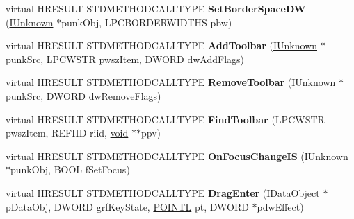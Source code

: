 \begin{DoxyCompactItemize}
\item 
\mbox{\label{class_c_common_browser_a0593cb501e88f934cb0a01f42e960cf0}} 
virtual H\+R\+E\+S\+U\+LT S\+T\+D\+M\+E\+T\+H\+O\+D\+C\+A\+L\+L\+T\+Y\+PE {\bfseries Set\+Border\+Space\+DW} (\hyperlink{interface_i_unknown}{I\+Unknown} $\ast$punk\+Obj, L\+P\+C\+B\+O\+R\+D\+E\+R\+W\+I\+D\+T\+HS pbw)
\item 
\mbox{\label{class_c_common_browser_a60b4607afb24afaa815d54dcf71691d6}} 
virtual H\+R\+E\+S\+U\+LT S\+T\+D\+M\+E\+T\+H\+O\+D\+C\+A\+L\+L\+T\+Y\+PE {\bfseries Add\+Toolbar} (\hyperlink{interface_i_unknown}{I\+Unknown} $\ast$punk\+Src, L\+P\+C\+W\+S\+TR pwsz\+Item, D\+W\+O\+RD dw\+Add\+Flags)
\item 
\mbox{\label{class_c_common_browser_acb1a1421cc2b6f0742801b1ea574cdb1}} 
virtual H\+R\+E\+S\+U\+LT S\+T\+D\+M\+E\+T\+H\+O\+D\+C\+A\+L\+L\+T\+Y\+PE {\bfseries Remove\+Toolbar} (\hyperlink{interface_i_unknown}{I\+Unknown} $\ast$punk\+Src, D\+W\+O\+RD dw\+Remove\+Flags)
\item 
\mbox{\label{class_c_common_browser_a145537e55fc865c879ebbd1c4d8a8868}} 
virtual H\+R\+E\+S\+U\+LT S\+T\+D\+M\+E\+T\+H\+O\+D\+C\+A\+L\+L\+T\+Y\+PE {\bfseries Find\+Toolbar} (L\+P\+C\+W\+S\+TR pwsz\+Item, R\+E\+F\+I\+ID riid, \hyperlink{interfacevoid}{void} $\ast$$\ast$ppv)
\item 
\mbox{\label{class_c_common_browser_aad8ff4bdf8a8dd8fb00b70612d2ae5eb}} 
virtual H\+R\+E\+S\+U\+LT S\+T\+D\+M\+E\+T\+H\+O\+D\+C\+A\+L\+L\+T\+Y\+PE {\bfseries On\+Focus\+Change\+IS} (\hyperlink{interface_i_unknown}{I\+Unknown} $\ast$punk\+Obj, B\+O\+OL f\+Set\+Focus)
\item 
\mbox{\label{class_c_common_browser_a401d58d5d3c9c1c573bc4b72b0d05aa1}} 
virtual H\+R\+E\+S\+U\+LT S\+T\+D\+M\+E\+T\+H\+O\+D\+C\+A\+L\+L\+T\+Y\+PE {\bfseries Drag\+Enter} (\hyperlink{interface_i_data_object}{I\+Data\+Object} $\ast$p\+Data\+Obj, D\+W\+O\+RD grf\+Key\+State, \hyperlink{struct___p_o_i_n_t_l}{P\+O\+I\+N\+TL} pt, D\+W\+O\+RD $\ast$pdw\+Effect)
\item 
\mbox{\label{class_c_common_browser_a1114d43c96a11864070cda964f65e74b}} 
$$
\end{DoxyCompactItemize}
